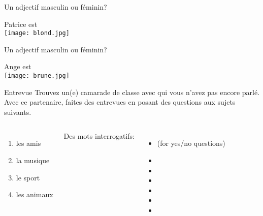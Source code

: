 \documentclass{beamer}
\begin{document}
  \begin{frame}{Un adjectif masculin ou féminin?}
    \begin{center}
      Patrice est \underline{} \\
      \texttt{[image: blond.jpg]}
    \end{center}
  \end{frame}

  \begin{frame}{Un adjectif masculin ou féminin?}
    \begin{center}
      Ange est \underline{} \\
      \texttt{[image: brune.jpg]}
    \end{center}
  \end{frame}

  \begin{frame}{Entrevue}
    Trouvez un(e) camarade de classe avec qui vous n'avez pas encore parlé. Avec ce partenaire, faites des entrevues en posant des questions aux sujets suivants. \\
    \begin{columns}
        \begin{enumerate}
          \item les amis
          \item la musique
          \item le sport
          \item les animaux
        \end{enumerate}
        Des mots interrogatifs:
        \begin{itemize}
          \item {} (for yes/no questions)
          \item {} 
          \item {} 
          \item {} 
          \item {} 
          \item {} 
          \item {} 
        \end{itemize}
    \end{columns}
  \end{frame}
\end{document}

